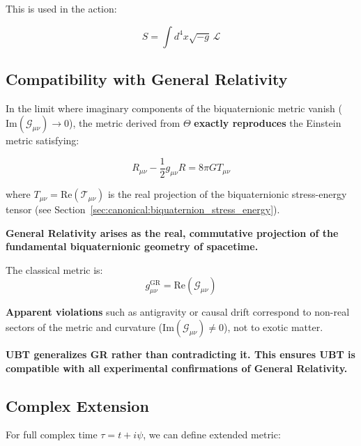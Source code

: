 This is used in the action:

\begin{equation}
S = \int d^4x \sqrt{-g}\, \mathcal{L}
\end{equation}

\subsection{Compatibility with General Relativity}

In the limit where imaginary components of the biquaternionic metric vanish ($\text{Im}(\mathcal{G}_{\mu\nu}) \to 0$), the metric derived from $\Theta$ \textbf{exactly reproduces} the Einstein metric satisfying:

\begin{equation}
\label{eq:canonical:einstein_equation_from_real}
R_{\mu\nu} - \frac{1}{2} g_{\mu\nu} R = 8\pi G T_{\mu\nu}
\end{equation}

where $T_{\mu\nu} = \text{Re}(\mathcal{T}_{\mu\nu})$ is the real projection of the biquaternionic stress-energy tensor (see Section~\ref{sec:canonical:biquaternion_stress_energy}).

\begin{tcolorbox}[colback=blue!5!white,colframe=blue!75!black,title=General Relativity as Real Projection]
\textbf{General Relativity arises as the real, commutative projection of the fundamental biquaternionic geometry of spacetime.}

The classical metric is:
\begin{equation}
g_{\mu\nu}^{\text{GR}} = \text{Re}(\mathcal{G}_{\mu\nu})
\end{equation}

\textbf{Apparent violations} such as antigravity or causal drift correspond to non-real sectors of the metric and curvature ($\text{Im}(\mathcal{G}_{\mu\nu}) \neq 0$), not to exotic matter.

\textbf{UBT generalizes GR rather than contradicting it. This ensures UBT is compatible with all experimental confirmations of General Relativity.}
\end{tcolorbox}

\subsection{Complex Extension}

For full complex time $\tau = t + i\psi$, we can define extended metric:

